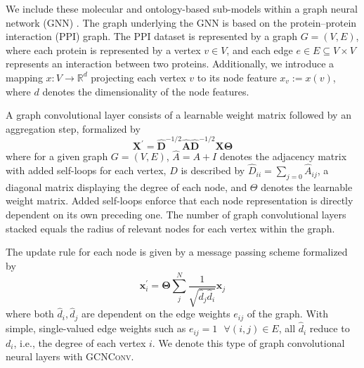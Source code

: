 \documentclass{bioinfo}
\renewcommand{\cite}{\citep}
\begin{document}
We include these molecular and ontology-based sub-models within a
graph neural network (GNN) \cite{}. The graph underlying the GNN is
based on the protein--protein interaction (PPI) graph. The PPI dataset
is represented by a graph $G=(V,E)$, where each protein is represented
by a vertex $v\in V$, and each edge $e\in E\subseteq V\times V$
represents an interaction between two proteins. Additionally, we
introduce a mapping $x:V\rightarrow\mathbb{R}^{d}$ projecting each
vertex $v$ to its node feature $x_v := x(v)$, where $d$ denotes the
dimensionality of the node features.
 
A graph convolutional layer \cite{GCNConv} consists of a learnable
weight matrix followed by an aggregation step, formalized by
\begin{equation}
	\mathbf{X}^{\prime} = \mathbf{\hat{D}}^{-1/2} \mathbf{\hat{A}}
	\mathbf{\hat{D}}^{-1/2} \mathbf{X} \mathbf{\Theta}
\end{equation}
where for a given graph $G=(V,E)$, $\hat{A} = A + I$ denotes the
adjacency matrix with added self-loops for each vertex, $D$ is
described by $\hat{D}_{ii} = \sum_{j=0} \hat{A}_{ij}$, a diagonal
matrix displaying the degree of each node, and $\Theta$ denotes the
learnable weight matrix. Added self-loops enforce that each node
representation is directly dependent on its own preceding one. The
number of graph convolutional layers stacked equals the radius of
relevant nodes for each vertex within the graph.

The update rule for each node is given by a message passing scheme
formalized by
\begin{equation}
	\mathbf{x}^{\prime}_i = \mathbf{\Theta} \sum^{N}_{j}
	\frac{1}{\sqrt{\hat{d}_j \hat{d}_i}} \mathbf{x}_j
\end{equation}
where both $\hat{d}_i, \hat{d}_j$ are dependent on the edge weights
$e_{ij}$ of the graph. With simple, single-valued edge weights such as
$e_{ij}=1 \text{ }\forall (i,j)\in E$, all $\hat{d}_i$ reduce to
$d_i$, i.e., the degree of each vertex $i$. We denote this type of
graph convolutional neural layers with \textsc{GCNConv}.
\end{document}
